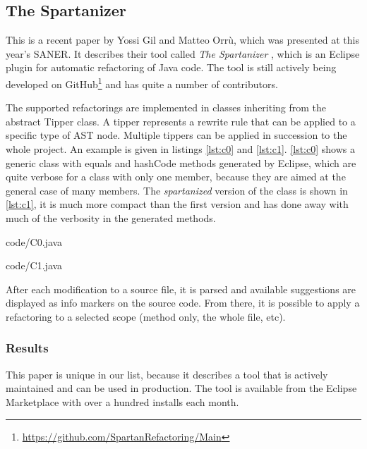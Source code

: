 \documentclass[conference,compsoc,a4paper]{IEEEtran}
\newcommand{\code}[1]{{\small\ttfamily #1}}
\begin{document}
\subsection{The Spartanizer} \label{sec:sparta}

This is a recent paper by Yossi Gil and Matteo Orrù, which was presented at this year's SANER. It describes their tool 
called \emph{The Spartanizer} \cite{sparta}, which is an Eclipse plugin for automatic refactoring of Java code. The 
tool is still actively being developed on GitHub\footnote{\url{https://github.com/SpartanRefactoring/Main}} and has 
quite a number of contributors.

The supported refactorings are implemented in classes inheriting from the abstract \code{Tipper} class. A tipper 
represents a rewrite rule that can be applied to a specific type of AST node. Multiple tippers can be applied in 
succession to the whole project. An example is given in listings \ref{lst:c0} and \ref{lst:c1}. \autoref{lst:c0} shows 
a generic class with \code{equals} and \code{hashCode} methods generated by Eclipse, which are quite verbose for a 
class with only one member, because they are aimed at the general case of many members. The \emph{spartanized} version 
of the class is shown in \autoref{lst:c1}, it is much more compact than the first version and has done away with much 
of the verbosity in the generated methods.


  {code/C0.java}


  {code/C1.java}

After each modification to a source file, it is parsed and available suggestions are displayed as info markers on the 
source code. From there, it is possible to apply a refactoring to a selected scope (method only, the whole file, etc).

\subsubsection{Results}

This paper is unique in our list, because it describes a tool that is actively maintained and can be used in 
production. The tool is available from the Eclipse Marketplace\footnotemark{} with over a hundred installs each month.

\end{document}
